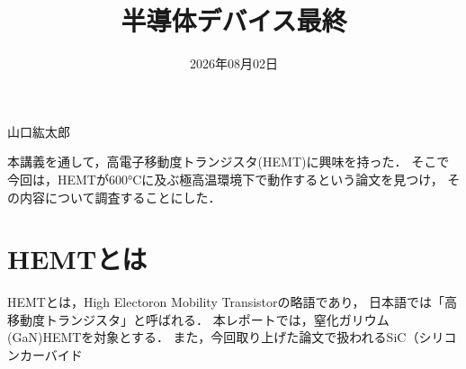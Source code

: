 \documentclass{ltjsarticle}  %
\date{2026年08月02日}        %
\title{半導体デバイス最終}  %
\makeatletter
\newcommand{\authorname}{山口紘太郎}  %
\renewcommand{\maketitle}{%
  \begin{flushright}
    \@date
  \end{flushright}
  \vspace{1cm}
  \begin{center}
    {\Large \@title}
  \end{center}
  \begin{flushright}
    {\large \authorname}
  \end{flushright}
  \vspace{1.5cm}
}
\makeatother
\begin{document}
\maketitle
本講義を通して，高電子移動度トランジスタ(HEMT)に興味を持った．
そこで今回は，HEMTが600°Cに及ぶ極高温環境下で動作するという論文を見つけ，
その内容について調査することにした．
\section{HEMTとは}
HEMTとは，High Electoron Mobility Transistorの略語であり，
日本語では「高移動度トランジスタ」と呼ばれる．
本レポートでは，窒化ガリウム(GaN)HEMTを対象とする．
また，今回取り上げた論文で扱われるSiC（シリコンカーバイド
\end{document}
